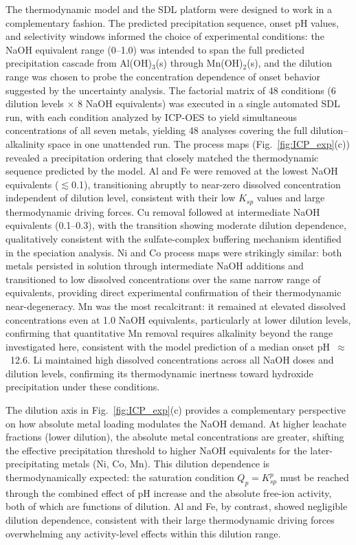 \documentclass[final,2p,times]{elsarticle}
\begin{document}
The thermodynamic model and the SDL platform were designed to work in a complementary fashion. The predicted precipitation sequence, onset pH values, and selectivity windows informed the choice of experimental conditions: the NaOH equivalent range (0--1.0) was intended to span the full predicted precipitation cascade from Al(OH)$_3$(s) through Mn(OH)$_2$(s), and the dilution range was chosen to probe the concentration dependence of onset behavior suggested by the uncertainty analysis. 
The factorial matrix of 48 conditions (6 dilution levels $\times$ 8 NaOH equivalents) was executed in a single automated SDL run, with each condition analyzed by ICP-OES to yield simultaneous concentrations of all seven metals, yielding 48 analyses covering the full dilution--alkalinity space in one unattended run. The process maps (Fig.~\ref{fig:ICP_exp}(c)) revealed a precipitation ordering that closely matched the thermodynamic sequence predicted by the model. Al and Fe were removed at the lowest NaOH equivalents ($\lesssim$0.1), transitioning abruptly to near-zero dissolved concentration independent of dilution level, consistent with their low $K_{sp}$ values and large thermodynamic driving forces. Cu removal followed at intermediate NaOH equivalents (0.1--0.3), with the transition showing moderate dilution dependence, qualitatively consistent with the sulfate-complex buffering mechanism identified in the speciation analysis. Ni and Co process maps were strikingly similar: both metals persisted in solution through intermediate NaOH additions and transitioned to low dissolved concentrations over the same narrow range of equivalents, providing direct experimental confirmation of their thermodynamic near-degeneracy. Mn was the most recalcitrant: it remained at elevated dissolved concentrations even at 1.0 NaOH equivalents, particularly at lower dilution levels, confirming that quantitative Mn removal requires alkalinity beyond the range investigated here, consistent with the model prediction of a median onset pH~$\approx$~12.6. Li maintained high dissolved concentrations across all NaOH doses and dilution levels, confirming its thermodynamic inertness toward hydroxide precipitation under these conditions.

The dilution axis in Fig.~\ref{fig:ICP_exp}(c) provides a complementary perspective on how absolute metal loading modulates the NaOH demand. At higher leachate fractions (lower dilution), the absolute metal concentrations are greater, shifting the effective precipitation threshold to higher NaOH equivalents for the later-precipitating metals (Ni, Co, Mn). This dilution dependence is thermodynamically expected: the saturation condition $Q_p = K_{sp}^p$ must be reached through the combined effect of pH increase and the absolute free-ion activity, both of which are functions of dilution. Al and Fe, by contrast, showed negligible dilution dependence, consistent with their large thermodynamic driving forces overwhelming any activity-level effects within this dilution range.
\end{document}
